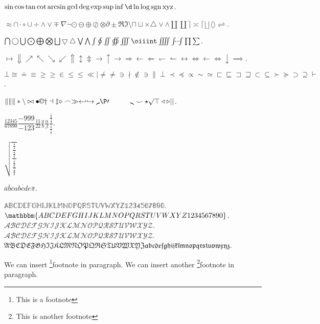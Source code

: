 \documentclass{ctexbook}
\DeclareMathOperator{\sgn}{sgn}
\begin{document}
\(\sin \cos \tan \cot \arcsin \gcd \deg \exp \sup \inf \d \ln \log \sgn \operatorname{xyz}\).

\(\approx \cap \cdot \circ \cup \div \land \lor \mp \nabla \neg \odot \ominus \oplus \oslash \otimes \partial \pm \Re \Im \setminus \sqcap \sqcup \times \triangle \vee \wedge \amalg \coprod \rceil \asymp \lceil \lfloor \rfloor \langle \rangle \rightleftharpoons \).

\(\bigcap \bigcirc \bigcup \bigodot \bigoplus \bigotimes \bigsqcup \bigtriangledown \bigtriangleup \bigvee \bigwedge \int \oint \iint \oiint \iiint \oiiint \iiiint \idotsint \prod \sum \).

\(\mapsto \Downarrow \nearrow \nwarrow \searrow \swarrow \Uparrow \updownarrow \Updownarrow \to \uparrow \rightarrow \Rightarrow \leftarrow \Leftarrow \leftharpoondown \leftharpoonup \leftrightarrow \Leftrightarrow \gets \iff \downarrow \implies\).

\(\bot \cong \doteq \equiv \ge \geq \in \le \leq \ll \mid \ne \neq \ni \nmid \notin \owns \parallel \perp \prec \preceq \propto \sim \simeq \sqsubset \sqsubseteq \sqsupset \sqsupseteq \subset \subseteq \succ \succeq \supset \supseteq \vdash \).

\(\| \lVert \rVert \ast \backslash \bowtie \bullet \copyright \dagger \dashv \ddagger \diamond \frown \gg \hookleftarrow \hookrightarrow \lmoustache \P \prime \quad \qquad \rmoustache \smile \star \surd \top \triangleleft \triangleright \lvert \rvert \).

\(\frac{12345}{67890} \dfrac{-999}{-123} \tfrac{11}{22} \frac{a}{b} \frac{\alpha}{\beta} \frac{\frac{\frac{1}{2}}{\frac{3}{4}}}{\frac{\frac{5}{6}}{\frac{7}{8}}}\).

\(\sqrt{\frac{\frac{\frac{\frac{1}{1}}{\frac{2}{2}}}{\frac{\frac{3}{3}}{\frac{4}{4}}}}{\frac{\frac{\frac{5}{5}}{\frac{6}{6}}}{\frac{\frac{7}{7}}{\frac{8}{8}}}}}\)

\(\overline{a} \overline{b} \overline{c} \overline{abcde}  \overline{\pi} \).

\(\mathbb{ABCDEFGHIJKLMNOPQRSTUVWXYZ1234567890} \).
\(\mathbbm{ABCDEFGHIJKLMNOPQRSTUVWXYZ1234567890} \).
\(\mathcal{ABCDEFGHIJKLMNOPQRSTUVWXYZ}\).
\(\mathscr{ABCDEFGHIJKLMNOPQRSTUVWXYZ}\).
\(\mathfrak{ABCDEFGHIJKLMNOPQRSTUVWXYZabcdefghijklmnopqrstuvwxyz}\).

We can insert \footnote{This is a footnote}{footnote} in paragraph.
We can insert another \footnote{This is another footnote}{footnote} in paragraph.
\end{document}
